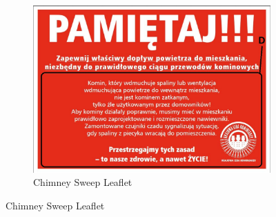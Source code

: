 \documentclass[a4paper,11pt,oneside]{scrreprt}
\begin{document}
\begin{figure}[H]
	

\begin{subfigure}{1\textwidth}
	\centering
	\includegraphics[clip, trim=0cm 0cm 0cm 0cm, scale=0.25]{./images/kominiarze-ulotka.jpg}
	\caption{Chimney Sweep Leaflet}
\end{subfigure}
\label{fig:test}

\end{figure}
\end{document}
